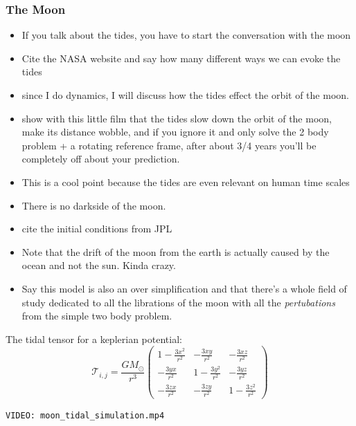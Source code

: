         \subsubsection*{The Moon}


            \begin{itemize}
                \item If you talk about the tides, you have to start the conversation with the moon
                \item Cite the NASA website and say how many different ways we can evoke the tides
                \item since I do dynamics, I will discuss how the tides effect the orbit of the moon. 
                \item show with this little film that the tides slow down the orbit of the moon, make its distance wobble, and if you ignore it and only solve the 2 body problem + a rotating reference frame, after about 3/4 years you'll be completely off about your prediction.
                \item This is a cool point because the tides are even relevant on human time scales 
                \item There is no darkside of the moon. 
                \item cite the initial conditions from JPL
                \item Note that the drift of the moon from the earth is actually caused by the ocean and not the sun. Kinda crazy.
                \item Say this model is also an over simplification and that there's a whole field of study dedicated to all the librations of the moon with all the \textit{pertubations} from the simple two body problem. 
            \end{itemize}

            The tidal tensor for a keplerian potential: 
            \begin{equation}
                \mathcal{T}_{i,j}= \frac{GM_\odot}{r^3}\left(\begin{matrix}
                    1-\frac{3x^2}{r^2} & -\frac{3xy}{r^2} & -\frac{3xz}{r^2} \\
                    -\frac{3yx}{r^2} & 1-\frac{3y^2}{r^2} & -\frac{3yz}{r^2} \\
                    -\frac{3zx}{r^2} & -\frac{3zy}{r^2} & 1-\frac{3z^2}{r^2}
                \end{matrix}\right)
            \end{equation}            
\begin{verbatim}
VIDEO: moon_tidal_simulation.mp4
\end{verbatim}

